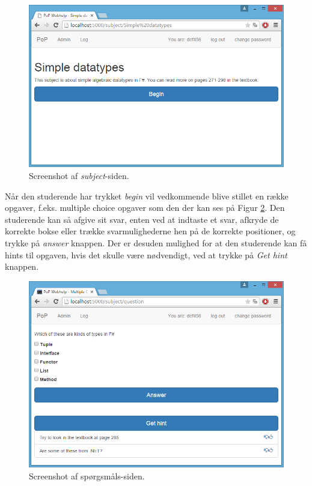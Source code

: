 \documentclass[11pt, a4paper]{article}
\begin{document}
\begin{figure}[htpb]
    \centering
    \includegraphics[width=1\linewidth]{figures/interface/subject.png}
    \caption{Screenshot af \emph{subject}-siden.}
    \label{fig:screenshot_subject}
\end{figure}

Når den studerende har trykket \emph{begin} vil vedkommende blive stillet en række opgaver, f.eks. multiple choice opgaver som den der kan ses på Figur \ref{fig:screenshot_question}. Den studerende kan så afgive sit svar, enten ved at indtaste et svar, afkryde de korrekte bokse eller trække svarmulighederne hen på de korrekte positioner, og trykke på \emph{answer} knappen. Der er desuden mulighed for at den studerende kan få hints til opgaven, hvis det skulle være nødvendigt, ved at trykke på \emph{Get hint} knappen.

\begin{figure}[htpb]
    \centering
    \includegraphics[width=1\linewidth]{figures/interface/question.png}
    \caption{Screenshot af spørgsmåls-siden.}
    \label{fig:screenshot_question}
\end{figure}
\end{document}
